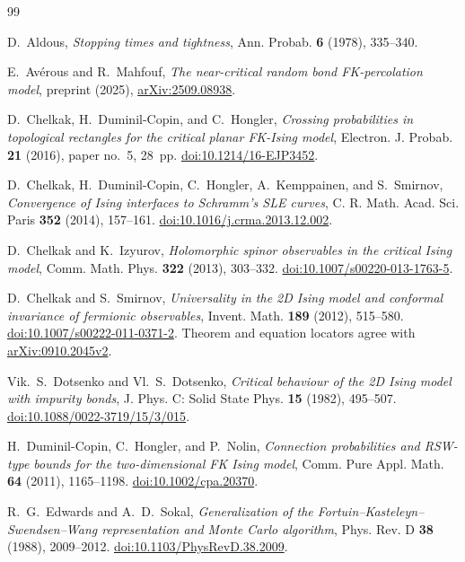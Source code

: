 \begin{thebibliography}{99}

D.~Aldous,
\emph{Stopping times and tightness},
Ann. Probab. \textbf{6} (1978), 335--340.

E.~Av\'erous and R.~Mahfouf,
\emph{The near-critical random bond FK-percolation model},
preprint (2025), \href{https://arxiv.org/abs/2509.08938}{arXiv:2509.08938}.

D.~Chelkak, H.~Duminil-Copin, and C.~Hongler,
\emph{Crossing probabilities in topological rectangles for the critical planar FK-Ising model},
Electron. J. Probab. \textbf{21} (2016), paper no.~5, 28~pp.
\href{https://doi.org/10.1214/16-EJP3452}{doi:10.1214/16-EJP3452}.

D.~Chelkak, H.~Duminil-Copin, C.~Hongler, A.~Kemppainen, and S.~Smirnov,
\emph{Convergence of Ising interfaces to Schramm's SLE curves},
C. R. Math. Acad. Sci. Paris \textbf{352} (2014), 157--161.
\href{https://doi.org/10.1016/j.crma.2013.12.002}{doi:10.1016/j.crma.2013.12.002}.

D.~Chelkak and K.~Izyurov,
\emph{Holomorphic spinor observables in the critical Ising model},
Comm. Math. Phys. \textbf{322} (2013), 303--332.
\href{https://doi.org/10.1007/s00220-013-1763-5}{doi:10.1007/s00220-013-1763-5}.

D.~Chelkak and S.~Smirnov,
\emph{Universality in the 2D Ising model and conformal invariance of fermionic observables},
Invent. Math. \textbf{189} (2012), 515--580.
\href{https://doi.org/10.1007/s00222-011-0371-2}{doi:10.1007/s00222-011-0371-2}.
Theorem and equation locators agree with
\href{https://arxiv.org/abs/0910.2045v2}{arXiv:0910.2045v2}.

Vik.~S.~Dotsenko and Vl.~S.~Dotsenko,
\emph{Critical behaviour of the 2D Ising model with impurity bonds},
J. Phys. C: Solid State Phys. \textbf{15} (1982), 495--507.
\href{https://doi.org/10.1088/0022-3719/15/3/015}{doi:10.1088/0022-3719/15/3/015}.

H.~Duminil-Copin, C.~Hongler, and P.~Nolin,
\emph{Connection probabilities and RSW-type bounds for the two-dimensional FK Ising model},
Comm. Pure Appl. Math. \textbf{64} (2011), 1165--1198.
\href{https://doi.org/10.1002/cpa.20370}{doi:10.1002/cpa.20370}.

R.~G.~Edwards and A.~D.~Sokal,
\emph{Generalization of the Fortuin--Kasteleyn--Swendsen--Wang representation and Monte Carlo algorithm},
Phys. Rev. D \textbf{38} (1988), 2009--2012.
\href{https://doi.org/10.1103/PhysRevD.38.2009}{doi:10.1103/PhysRevD.38.2009}.


\end{thebibliography}

